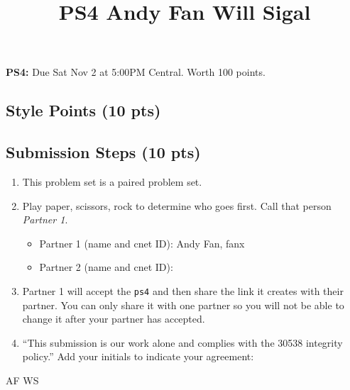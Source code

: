 \documentclass[
  letterpaper,
  DIV=11,
  numbers=noendperiod]{scrartcl}
\title{PS4 Andy Fan Will Sigal}
\author{}
\date{}
\providecommand{\tightlist}{%
  \setlength{\itemsep}{0pt}\setlength{\parskip}{0pt}}\usepackage{longtable,booktabs,array}
\begin{document}
\maketitle



\textbf{PS4:} Due Sat Nov 2 at 5:00PM Central. Worth 100 points.

\subsection{Style Points (10 pts)}\label{style-points-10-pts}

\subsection{Submission Steps (10 pts)}\label{submission-steps-10-pts}

\begin{enumerate}
\def\labelenumi{\arabic{enumi}.}
\tightlist
\item
  This problem set is a paired problem set.
\item
  Play paper, scissors, rock to determine who goes first. Call that
  person \emph{Partner 1}.

  \begin{itemize}
  \tightlist
  \item
    Partner 1 (name and cnet ID): Andy Fan, fanx
  \item
    Partner 2 (name and cnet ID):
  \end{itemize}
\item
  Partner 1 will accept the \texttt{ps4} and then share the link it
  creates with their partner. You can only share it with one partner so
  you will not be able to change it after your partner has accepted.
\item
  ``This submission is our work alone and complies with the 30538
  integrity policy.'' Add your initials to indicate your agreement:
\end{enumerate}

AF WS
\end{document}
